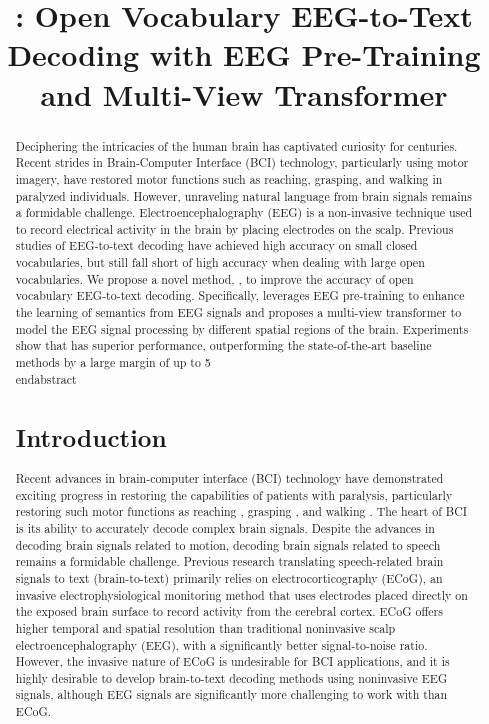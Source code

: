 
\title{\our: Open Vocabulary EEG-to-Text Decoding with EEG Pre-Training and Multi-View Transformer}
\maketitle

\begin{abstract}
Deciphering the intricacies of the human brain has captivated curiosity for centuries. Recent strides in Brain-Computer Interface (BCI) technology, particularly using motor imagery, have restored motor functions such as reaching, grasping, and walking in paralyzed individuals. However, unraveling natural language from brain signals remains a formidable challenge. Electroencephalography (EEG) is a non-invasive technique used to record electrical activity in the brain by placing electrodes on the scalp. Previous studies of EEG-to-text decoding have achieved high accuracy on small closed vocabularies, but still fall short of high accuracy when dealing with large open vocabularies.  
We propose a novel method, \our, to improve the accuracy of open vocabulary EEG-to-text decoding. 
Specifically, \our leverages EEG pre-training to enhance the learning of semantics from EEG signals and proposes a multi-view transformer to model the EEG signal processing by different spatial regions of the brain. Experiments show that \our has superior performance, outperforming the state-of-the-art baseline methods by a large margin of up to 5\\end{abstract}

\section{Introduction}

Recent advances in brain-computer interface (BCI) technology have demonstrated exciting progress in restoring the capabilities of patients with paralysis, particularly restoring such motor functions as reaching \cite{hochberg2012reach}, grasping \cite{aflalo2015decoding,bouton2016restoring}, and walking \cite{lorach2023walking}. The heart of BCI is its ability to accurately decode complex brain signals. Despite the advances in decoding brain signals related to motion, decoding brain signals related to speech remains a formidable challenge. Previous research translating speech-related brain signals to text (brain-to-text) primarily relies on electrocorticography (ECoG), an invasive electrophysiological monitoring method that uses electrodes placed directly on the exposed brain surface to record activity from the cerebral cortex. ECoG offers higher temporal and spatial resolution than traditional noninvasive scalp electroencephalography (EEG), with a significantly better signal-to-noise ratio. However, the invasive nature of ECoG is undesirable for BCI applications, and it is highly desirable to develop brain-to-text decoding methods using noninvasive EEG signals, although EEG signals are significantly more challenging to work with than ECoG.  


\end{abstract}
